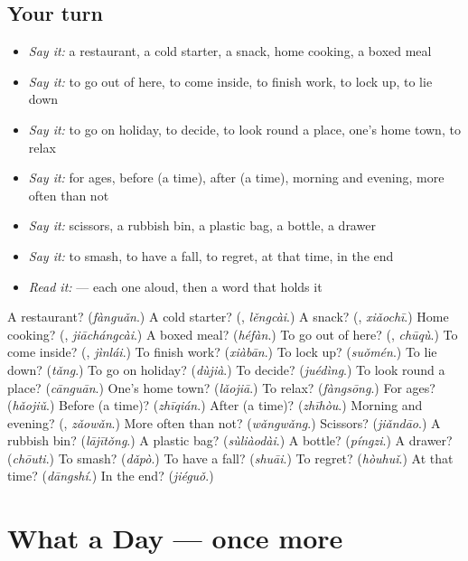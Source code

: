 \subsection*{Your turn}
\begin{itemize}
\raggedright
  \item \emph{Say it:} a restaurant, a cold starter, a snack, home cooking, a boxed meal
  \item \emph{Say it:} to go out of here, to come inside, to finish work, to lock up, to lie down
  \item \emph{Say it:} to go on holiday, to decide, to look round a place, one's home town, to relax
  \item \emph{Say it:} for ages, before (a time), after (a time), morning and evening, more often than not
  \item \emph{Say it:} scissors, a rubbish bin, a plastic bag, a bottle, a drawer
  \item \emph{Say it:} to smash, to have a fall, to regret, at that time, in the end
  \item \emph{Read it:}  — each one aloud, then a word that holds it
\end{itemize}

\begin{tcolorbox}[breakable,colback=teal!4,colframe=teal!35!black,title={Before you move on}]
A restaurant? (\emph{fànguǎn}.) A cold starter? (\textbf{}, \emph{lěngcài}.) A snack? (\textbf{}, \emph{xiǎochī}.) Home cooking? (\textbf{}, \emph{jiāchángcài}.) A boxed meal? (\emph{héfàn}.) To go out of here? (\textbf{}, \emph{chūqù}.) To come inside? (\textbf{}, \emph{jìnlái}.) To finish work? (\emph{xiàbān}.) To lock up? (\emph{suǒmén}.) To lie down? (\emph{tǎng}.) To go on holiday? (\emph{dùjià}.) To decide? (\emph{juédìng}.) To look round a place? (\emph{cānguān}.) One's home town? (\emph{lǎojiā}.) To relax? (\emph{fàngsōng}.) For ages? (\emph{hǎojiǔ}.) Before (a time)? (\emph{zhīqián}.) After (a time)? (\emph{zhīhòu}.) Morning and evening? (\textbf{}, \emph{zǎowǎn}.) More often than not? (\emph{wǎngwǎng}.) Scissors? (\emph{jiǎndāo}.) A rubbish bin? (\emph{lājītǒng}.) A plastic bag? (\emph{sùliàodài}.) A bottle? (\emph{píngzi}.) A drawer? (\emph{chōuti}.) To smash? (\emph{dǎpò}.) To have a fall? (\emph{shuāi}.) To regret? (\emph{hòuhuǐ}.) At that time? (\emph{dāngshí}.) In the end? (\emph{jiéguǒ}.)
\end{tcolorbox}
\section[(dialogue)]{What a Day — once more}

